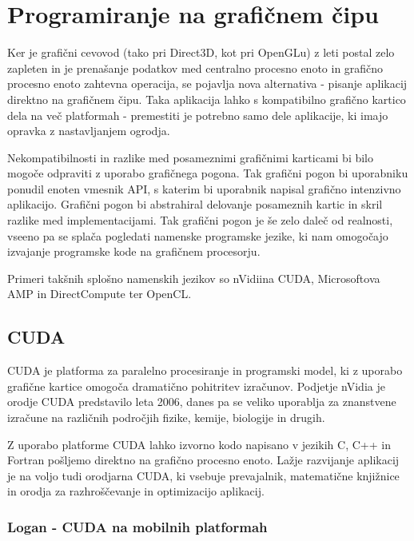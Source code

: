 \chapter{Programiranje na grafičnem čipu}
\label{sec:gpu}

Ker je grafični cevovod (tako pri Direct3D, kot pri OpenGLu) z leti postal zelo zapleten in je prenašanje podatkov med centralno procesno enoto in grafično procesno enoto zahtevna operacija, se pojavlja nova alternativa - pisanje aplikacij direktno na grafičnem čipu. Taka aplikacija lahko s kompatibilno grafično kartico dela na več platformah - premestiti je potrebno samo dele aplikacije, ki imajo opravka z nastavljanjem ogrodja. 

Nekompatibilnosti in razlike med posameznimi grafičnimi karticami bi bilo mogoče odpraviti z uporabo grafičnega pogona. Tak grafični pogon bi uporabniku ponudil enoten vmesnik API, s katerim bi uporabnik napisal grafično intenzivno aplikacijo. Grafični pogon bi abstrahiral delovanje posameznih kartic in skril razlike med implementacijami. Tak grafični pogon je še zelo daleč od realnosti, vseeno pa se splača pogledati namenske programske jezike, ki nam omogočajo izvajanje programske kode na grafičnem procesorju.

Primeri takšnih splošno namenskih jezikov so nVidiina CUDA, Microsoftova AMP in DirectCompute ter OpenCL.

\section{CUDA}
CUDA \cite{cuda} je platforma za paralelno procesiranje in programski model, ki z uporabo grafične kartice omogoča dramatično pohitritev izračunov. Podjetje nVidia je orodje CUDA predstavilo leta 2006, danes pa se veliko uporablja za znanstvene izračune na različnih področjih fizike, kemije, biologije in drugih.

Z uporabo platforme CUDA lahko izvorno kodo napisano v jezikih C, C++ in Fortran pošljemo direktno na grafično procesno enoto. Lažje razvijanje aplikacij je na voljo tudi orodjarna CUDA, ki vsebuje prevajalnik, matematične knjižnice in orodja za razhroščevanje in optimizacijo aplikacij.

\subsection{Logan - CUDA na mobilnih platformah}

